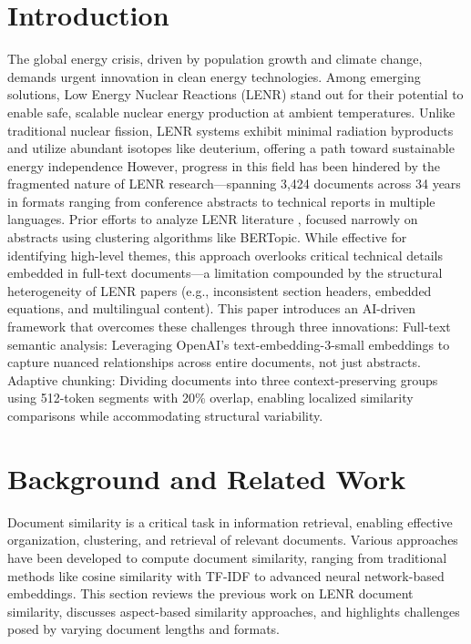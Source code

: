 \documentclass[12pt]{article}
\begin{document}
\section{Introduction}
The global energy crisis, driven by population growth and climate change, demands urgent innovation in clean energy technologies. Among emerging solutions, Low Energy Nuclear Reactions (LENR) stand out for their potential to enable safe, scalable nuclear energy production at ambient temperatures. Unlike traditional nuclear fission, LENR systems exhibit minimal radiation byproducts and utilize abundant isotopes like deuterium, offering a path toward sustainable energy independence 
However, progress in this field has been hindered by the fragmented nature of LENR research—spanning 3,424 documents across 34 years in formats ranging from conference abstracts to technical reports in multiple languages.
Prior efforts to analyze LENR literature \cite{FrontierAI2024}
, focused narrowly on abstracts using clustering algorithms like BERTopic. While effective for identifying high-level themes, this approach overlooks critical technical details embedded in full-text documents—a limitation compounded by the structural heterogeneity of LENR papers (e.g., inconsistent section headers, embedded equations, and multilingual content).
This paper introduces an AI-driven framework that overcomes these challenges through three innovations:
Full-text semantic analysis: Leveraging OpenAI’s text-embedding-3-small embeddings to capture nuanced relationships across entire documents, not just abstracts.
Adaptive chunking: Dividing documents into three context-preserving groups using 512-token segments with 20\% overlap, enabling localized similarity comparisons while accommodating structural variability.
    
    \section{Background and Related Work}

    Document similarity is a critical task in information retrieval, enabling effective organization, clustering, and retrieval of relevant documents. Various approaches have been developed to compute document similarity, ranging from traditional methods like cosine similarity with TF-IDF to advanced neural network-based embeddings. This section reviews the previous work on LENR document similarity, discusses aspect-based similarity approaches, and highlights challenges posed by varying document lengths and formats.
    
\end{document}
